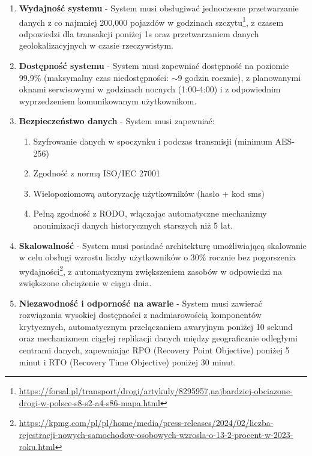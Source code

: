 \documentclass[12pt]{article}
\begin{document}
\begin{enumerate}
    \item \textbf{Wydajność systemu} - System musi obsługiwać jednoczesne przetwarzanie danych z co najmniej 200,000 pojazdów w godzinach szczytu\footnote{\url{https://forsal.pl/transport/drogi/artykuly/8295957,najbardziej-obciazone-drogi-w-polsce-s8-s2-a4-s86-mapa.html}}, z czasem odpowiedzi dla transakcji poniżej 1s oraz przetwarzaniem danych geolokalizacyjnych w czasie rzeczywistym.

    \item \textbf{Dostępność systemu} - System musi zapewniać dostępność na poziomie 99,9\% (maksymalny czas niedostępności: $\sim$9 godzin rocznie), z planowanymi oknami serwisowymi w godzinach nocnych (1:00-4:00) i z odpowiednim wyprzedzeniem komunikowanym użytkownikom.

    \item \textbf{Bezpieczeństwo danych} - System musi zapewniać:
    \begin{enumerate}
        \item Szyfrowanie danych w spoczynku i podczas transmisji (minimum AES-256)
        \item Zgodność z normą ISO/IEC 27001
        \item Wielopoziomową autoryzację użytkowników (hasło + kod sms)
        \item Pełną zgodność z RODO, włączając automatyczne mechanizmy anonimizacji danych historycznych starszych niż 5 lat.
    \end{enumerate}

    \item \textbf{Skalowalność} - System musi posiadać architekturę umożliwiającą skalowanie w celu obsługi wzrostu liczby użytkowników o 30\% rocznie bez pogorszenia wydajności\footnote{\url{https://kpmg.com/pl/pl/home/media/press-releases/2024/02/liczba-rejestracji-nowych-samochodow-osobowych-wzrosla-o-13-2-procent-w-2023-roku.html}}, z automatycznym zwiększeniem zasobów w odpowiedzi na zwiększone obciążenie w ciągu dnia.

    \item \textbf{Niezawodność i odporność na awarie} - System musi zawierać rozwiązania wysokiej dostępności z nadmiarowością komponentów krytycznych, automatycznym przełączaniem awaryjnym poniżej 10 sekund oraz mechanizmem ciągłej replikacji danych między geograficznie odległymi centrami danych, zapewniając RPO (Recovery Point Objective) poniżej 5 minut i RTO (Recovery Time Objective) poniżej 30 minut.


\end{enumerate}
\end{document}
